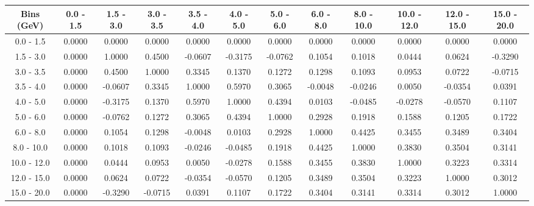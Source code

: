 \documentclass[aps, prd, reprint,showpacs,  preprintnumbers,amsmath,amssymb,superscriptaddress, nofootinbib]{revtex4-1}
\makeatletter
\renewenvironment{table}
  {\def\@captype{table}}
  {}
\makeatother
\begin{document}
\begin{table}
\centering
\begin{tabular}{cccccccccccc}
\hline
    Bins (GeV) &    0.0 - 1.5 &    1.5 - 3.0 &    3.0 - 3.5 &    3.5 - 4.0 &    4.0 - 5.0 &    5.0 - 6.0 &    6.0 - 8.0 &   8.0 - 10.0 &  10.0 - 12.0 &  12.0 - 15.0 &  15.0 - 20.0 \\ 
\hline
  0.0 -  1.5  & 0.0000  & 0.0000  & 0.0000  & 0.0000  & 0.0000  & 0.0000  & 0.0000  & 0.0000  & 0.0000  & 0.0000  & 0.0000 \\
  1.5 -  3.0  & 0.0000  & 1.0000  & 0.4500  &-0.0607  &-0.3175  &-0.0762  & 0.1054  & 0.1018  & 0.0444  & 0.0624  &-0.3290 \\
  3.0 -  3.5  & 0.0000  & 0.4500  & 1.0000  & 0.3345  & 0.1370  & 0.1272  & 0.1298  & 0.1093  & 0.0953  & 0.0722  &-0.0715 \\
  3.5 -  4.0  & 0.0000  &-0.0607  & 0.3345  & 1.0000  & 0.5970  & 0.3065  &-0.0048  &-0.0246  & 0.0050  &-0.0354  & 0.0391 \\
  4.0 -  5.0  & 0.0000  &-0.3175  & 0.1370  & 0.5970  & 1.0000  & 0.4394  & 0.0103  &-0.0485  &-0.0278  &-0.0570  & 0.1107 \\
  5.0 -  6.0  & 0.0000  &-0.0762  & 0.1272  & 0.3065  & 0.4394  & 1.0000  & 0.2928  & 0.1918  & 0.1588  & 0.1205  & 0.1722 \\
  6.0 -  8.0  & 0.0000  & 0.1054  & 0.1298  &-0.0048  & 0.0103  & 0.2928  & 1.0000  & 0.4425  & 0.3455  & 0.3489  & 0.3404 \\
  8.0 - 10.0  & 0.0000  & 0.1018  & 0.1093  &-0.0246  &-0.0485  & 0.1918  & 0.4425  & 1.0000  & 0.3830  & 0.3504  & 0.3141 \\
 10.0 - 12.0  & 0.0000  & 0.0444  & 0.0953  & 0.0050  &-0.0278  & 0.1588  & 0.3455  & 0.3830  & 1.0000  & 0.3223  & 0.3314 \\
 12.0 - 15.0  & 0.0000  & 0.0624  & 0.0722  &-0.0354  &-0.0570  & 0.1205  & 0.3489  & 0.3504  & 0.3223  & 1.0000  & 0.3012 \\
 15.0 - 20.0  & 0.0000  &-0.3290  &-0.0715  & 0.0391  & 0.1107  & 0.1722  & 0.3404  & 0.3141  & 0.3314  & 0.3012  & 1.0000 \\
\hline
\hline
\end{tabular}
\caption{Correlation matrix for bins of $\sigma(E_\nu)$.}
\label{tb:piz_sigma-Ev_cov}
\end{table}
\end{document}

